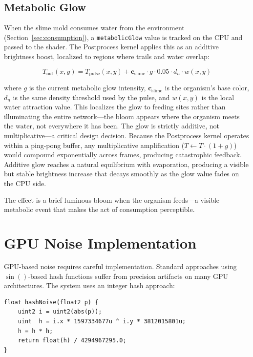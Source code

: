 \documentclass[12pt, titlepage]{article}
\begin{document}
\subsection{Metabolic Glow}
\label{sec:glow}

When the slime mold consumes water from the environment
(Section~\ref{sec:consumption}), a \texttt{metabolicGlow} value is tracked on
the CPU and passed to the shader. The Postprocess kernel applies this as an
additive brightness boost, localized to regions where trails and water overlap:

\begin{equation}
    T_{\text{out}}(x,y) = T_{\text{pulse}}(x,y) +
    \mathbf{c}_{\text{slime}} \cdot g \cdot 0.05 \cdot d_n \cdot w(x,y)
\end{equation}

where $g$ is the current metabolic glow intensity,
$\mathbf{c}_{\text{slime}}$ is the organism's base color, $d_n$ is the
same density threshold used by the pulse, and $w(x,y)$ is the local water
attraction value. This localizes the glow to feeding sites rather than
illuminating the entire network---the bloom appears where the organism meets
the water, not everywhere it has been. The glow is strictly additive, not
multiplicative---a critical design decision. Because the Postprocess kernel
operates within a ping-pong buffer, any multiplicative amplification
($T \gets T \cdot (1 + g)$) would compound exponentially across frames,
producing catastrophic feedback. Additive glow reaches a natural equilibrium
with evaporation, producing a visible but stable brightness increase that
decays smoothly as the glow value fades on the CPU side.

The effect is a brief luminous bloom when the organism feeds---a visible
metabolic event that makes the act of consumption perceptible.

\section{GPU Noise Implementation}
\label{sec:noise}

GPU-based noise requires careful implementation. Standard approaches using
$\sin()$-based hash functions suffer from precision artifacts on many GPU
architectures. The system uses an integer hash approach:

\begin{lstlisting}
float hashNoise(float2 p) {
    uint2 i = uint2(abs(p));
    uint  h = i.x * 1597334677u ^ i.y * 3812015801u;
    h = h * h;
    return float(h) / 4294967295.0;
}
\end{lstlisting}
\end{document}
